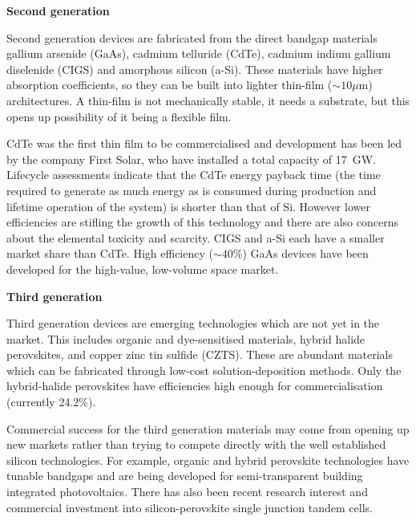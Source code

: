 \textbf{Second generation}

Second generation devices are fabricated from the direct bandgap materials gallium arsenide (GaAs), cadmium telluride (CdTe), cadmium indium gallium diselenide (CIGS) and amorphous silicon (a-Si). These materials have higher absorption coefficients, so they can be built into lighter thin-film ($\sim 10\mu \textrm{m}$) architectures. A thin-film is not mechanically stable, it needs a substrate, but this opens up possibility of it being a flexible film.

CdTe was the first thin film to be commercialised and development has been led by the company First Solar, who have installed a total capacity of \SI{17}{\giga\watt}. Lifecycle assessments indicate that the CdTe energy payback time (the time required to generate as much energy as is consumed during production and lifetime operation of the system) is shorter than that of Si.\autocite{Koppelaar2017} However lower efficiencies are stifling the growth of this technology and there are also concerns about the elemental toxicity and scarcity. CIGS and a-Si each have a smaller market share than CdTe. High efficiency ($\sim 40\%$) GaAs devices have been developed for the high-value, low-volume space market.


\textbf{Third generation}

Third generation devices are emerging technologies which are not yet in the market. This includes organic and dye-sensitised materials, hybrid halide perovskites, and copper zinc tin sulfide (CZTS). These are abundant materials which can be fabricated through low-cost solution-deposition methods. Only the hybrid-halide perovskites have efficiencies high enough for commercialisation (currently 24.2\%).

Commercial success for the third generation materials may come from opening up new markets rather than trying to compete directly with the well established silicon technologies. For example, organic and hybrid perovskite technologies have tunable bandgaps and are being developed for semi-transparent building integrated photovoltaics.
There has also been recent research interest and commercial investment into silicon-perovskite single junction tandem cells.

